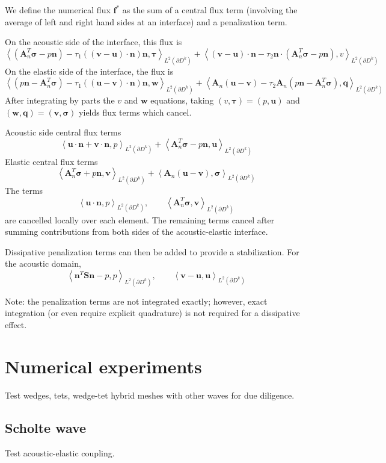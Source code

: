 \documentclass{siamart0216}
\newcommand{\LRp}[1]{\left( #1 \right)}
\newcommand{\LRa}[1]{\left\langle #1 \right\rangle}
\newcommand{\Ldk}{L^2\LRp{\partial D^k}}
\begin{document}
We define the numerical flux $\bm{f}^*$ as the sum of a central flux term (involving the average of left and right hand sides at an interface) and a penalization term.  

On the acoustic side of the interface, this flux is
\[
\LRa{\LRp{\bm{A}_n^T\bm{\sigma}-p\bm{n}} - \tau_1\LRp{\LRp{\bm{v}-\bm{u}}\cdot\bm{n}}\bm{n},\bm{\tau}}_{\Ldk}
+
\LRa{\LRp{\bm{v}-\bm{u}}\cdot\bm{n} - \tau_2\bm{n}\cdot\LRp{\bm{A}_n^T\bm{\sigma}-p\bm{n}},v}_{\Ldk}
\]
On the elastic side of the interface, the flux is
\[
\LRa{\LRp{p\bm{n}-\bm{A}_n^T\bm{\sigma}} - \tau_1 \LRp{\LRp{\bm{u}-\bm{v}}\cdot\bm{n}}\bm{n},\bm{w}}_{\Ldk}
+
\LRa{\bm{A}_n\LRp{\bm{u}-\bm{v}} - \tau_{2}\bm{A}_n\LRp{p\bm{n}-\bm{A}_n^T\bm{\sigma}},\bm{q}}_{\Ldk}
\]
After integrating by parts the $v$ and $\bm{w}$ equations, taking $(v,\bm{\tau}) = (p,\bm{u})$ and $(\bm{w},\bm{q})=(\bm{v},\bm{\sigma})$ yields flux terms which cancel.  

Acoustic side central flux terms
\[
\LRa{\bm{u}\cdot\bm{n} + \bm{v}\cdot\bm{n},p}_{\Ldk} + \LRa{\bm{A}_n^T\bm{\sigma} - p\bm{n},\bm{u}}_{\Ldk}
\]
Elastic central flux terms
\[
\LRa{\bm{A}_n^T\bm{\sigma} + p\bm{n},\bm{v}}_{\Ldk} + \LRa{ \bm{A}_n \LRp{\bm{u} - \bm{v}},\bm{\sigma}}_{\Ldk}
\]
The terms
\[
\LRa{\bm{u}\cdot\bm{n},p}_{\Ldk}, \qquad \LRa{\bm{A}_n^T\bm{\sigma},\bm{v}}_{\Ldk}
\]
are cancelled locally over each element.  The remaining terms cancel after summing contributions from both sides of the acoustic-elastic interface.

Dissipative penalization terms can then be added to provide a stabilization.  For the acoustic domain, 
\[
\LRa{\bm{n}^T\bm{S}\bm{n} - p, p}_{\Ldk}, \qquad \LRa{ \bm{v}-\bm{u},\bm{u}}_{\Ldk}
\]

Note: the penalization terms are not integrated exactly; however, exact integration (or even require explicit quadrature) is not required for a dissipative effect.  

\section{Numerical experiments}

Test wedges, tets, wedge-tet hybrid meshes with other waves for due diligence.  

\subsection{Scholte wave}

Test acoustic-elastic coupling.
\end{document}
